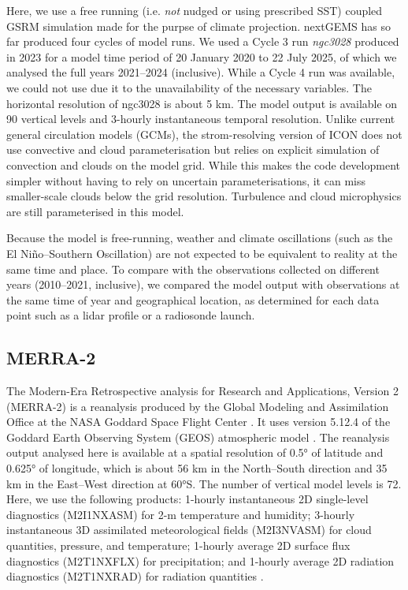 \documentclass[12pt,a4paper]{article}
\begin{document}
Here, we use a free running (i.e. \emph{not} nudged or using prescribed SST)
coupled GSRM simulation made for the purpse of climate projection.  nextGEMS
has so far produced four cycles of model runs. We used a Cycle 3 run
\emph{ngc3028} produced in 2023 \citep{nextgems2023a,nextgems2023b} for a model
time period of 20 January 2020 to 22 July 2025, of which we analysed the full
years 2021--2024 (inclusive). While a Cycle 4 run was available, we could not
use due it to the unavailability of the necessary variables. The horizontal
resolution of ngc3028 is about 5 km.  The model output is available on 90
vertical levels and 3-hourly instantaneous temporal resolution.  Unlike current
general circulation models (GCMs), the strom-resolving version of ICON does not
use convective and cloud parameterisation but relies on explicit simulation of
convection and clouds on the model grid. While this makes the code development
simpler without having to rely on uncertain parameterisations, it can miss
smaller-scale clouds below the grid resolution.  Turbulence and cloud
microphysics are still parameterised in this model.

Because the model is free-running, weather and climate oscillations (such as
the El Niño--Southern Oscillation) are not expected to be equivalent to reality
at the same time and place. To compare with the observations collected on
different years (2010--2021, inclusive), we compared the model output with
observations at the same time of year and geographical location, as determined
for each data point such as a lidar profile or a radiosonde launch.

\subsection{MERRA-2}

The Modern-Era Retrospective analysis for Research and Applications, Version 2
(MERRA-2) is a reanalysis produced by the Global Modeling and Assimilation
Office at the NASA Goddard Space Flight Center \citep{gelaro2017}.  It uses
version 5.12.4 of the Goddard Earth Observing System (GEOS) atmospheric model
\citep{rienecker2008,molod2015}. The reanalysis output analysed here is
available at a spatial resolution of 0.5° of latitude and 0.625° of longitude,
which is about 56 km in the North--South direction and 35 km in the East--West
direction at 60°S. The number of vertical model levels is 72. Here, we use the
following products: 1-hourly instantaneous 2D single-level diagnostics
(M2I1NXASM) for 2-m temperature and humidity; 3-hourly instantaneous 3D
assimilated meteorological fields (M2I3NVASM) for cloud quantities, pressure,
and temperature; 1-hourly average 2D surface flux diagnostics (M2T1NXFLX) for
precipitation; and 1-hourly average 2D radiation diagnostics
(M2T1NXRAD) for radiation quantities \citep{merra2}.
\end{document}
